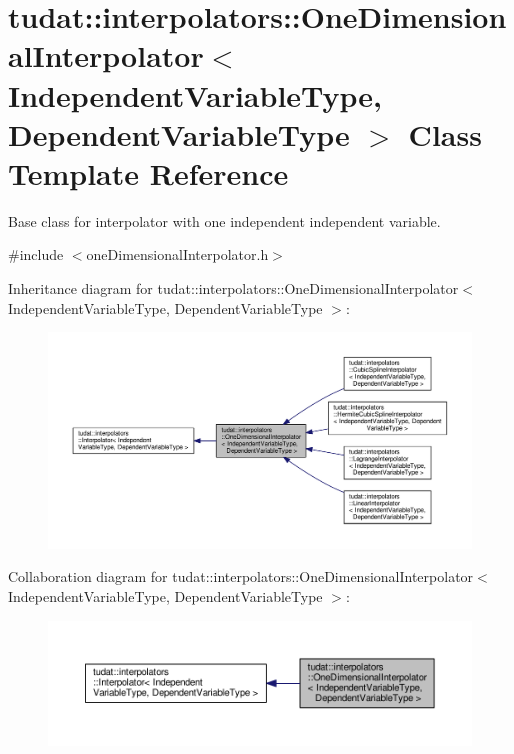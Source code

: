 \hypertarget{classtudat_1_1interpolators_1_1OneDimensionalInterpolator}{}\section{tudat\+:\+:interpolators\+:\+:One\+Dimensional\+Interpolator$<$ Independent\+Variable\+Type, Dependent\+Variable\+Type $>$ Class Template Reference}
\label{classtudat_1_1interpolators_1_1OneDimensionalInterpolator}


Base class for interpolator with one independent independent variable.  




{\ttfamily \#include $<$one\+Dimensional\+Interpolator.\+h$>$}



Inheritance diagram for tudat\+:\+:interpolators\+:\+:One\+Dimensional\+Interpolator$<$ Independent\+Variable\+Type, Dependent\+Variable\+Type $>$\+:
\nopagebreak
\begin{figure}[H]
\begin{center}
\leavevmode
\includegraphics[width=350pt]{classtudat_1_1interpolators_1_1OneDimensionalInterpolator__inherit__graph}
\end{center}
\end{figure}


Collaboration diagram for tudat\+:\+:interpolators\+:\+:One\+Dimensional\+Interpolator$<$ Independent\+Variable\+Type, Dependent\+Variable\+Type $>$\+:
\nopagebreak
\begin{figure}[H]
\begin{center}
\leavevmode
\includegraphics[width=350pt]{classtudat_1_1interpolators_1_1OneDimensionalInterpolator__coll__graph}
\end{center}
\end{figure}
